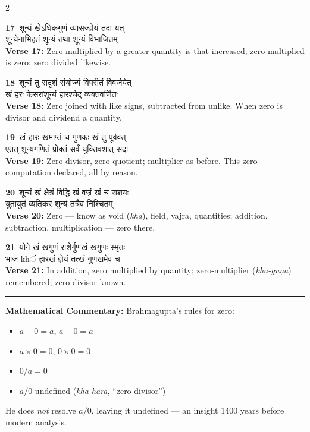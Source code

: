 \documentclass[11pt,a4paper]{article}
\newcommand{\dev}[1]{{\devanagarifont #1}}
\newcommand{\iast}[1]{\textit{#1}}
\newcommand{\vnum}[1]{\textcolor{versenumbercolor}{\textbf{#1}}}
\begin{document}
\begin{paracol}{2}

\switchcolumn[0]
\vnum{17}\ \dev{शून्यं खेऽधिकगुणं व्यासज्ज्ञेयं तदा यत्}\\
\dev{शून्येनाभिहतं शून्यं तथा शून्यं विभाजितम्}\\
\switchcolumn[1]
\textbf{Verse 17:} Zero multiplied by a greater quantity is that increased; zero multiplied is zero; zero divided likewise.

\switchcolumn[0]
\vnum{18}\ \dev{शून्यं तु सदृशं संयोज्यं विपरीतं विवर्जयेत्}\\
\dev{खं हरः केसरांशून्यं हारश्चेद् व्यक्तवर्जितः}\\
\switchcolumn[1]
\textbf{Verse 18:} Zero joined with like signs, subtracted from unlike. When zero is divisor and dividend a quantity.

\switchcolumn[0]
\vnum{19}\ \dev{खं हारः खमाप्तं च गुणकः खं तु पूर्ववत्}\\
\dev{एतत् शून्यगणितं प्रोक्तं सर्वं युक्तिवशात् सदा}\\
\switchcolumn[1]
\textbf{Verse 19:} Zero-divisor, zero quotient; multiplier as before. This zero-computation declared, all by reason.

\switchcolumn[0]
\vnum{20}\ \dev{शून्यं खं क्षेत्रं विद्धि खं वज्रं खं च राशयः}\\
\dev{युतायुतं व्यतिकरं शून्यं तत्रैव निश्चितम्}\\
\switchcolumn[1]
\textbf{Verse 20:} Zero --- know as void (\iast{kha}), field, vajra, quantities; addition, subtraction, multiplication --- zero there.

\switchcolumn[0]
\vnum{21}\ \dev{योगे खं खगुणं राशेर्गुणखं खगुणः स्मृतः}\\
\dev{भाज khं हारखं ज्ञेयं तत्खं गुणखमेव च}\\
\switchcolumn[1]
\textbf{Verse 21:} In addition, zero multiplied by quantity; zero-multiplier (\iast{kha-gu\d na}) remembered; zero-divisor known.

\end{paracol}

\vspace{0.3em}
\noindent\rule{\textwidth}{0.4pt}
\vspace{0.2em}
\noindent\textbf{Mathematical Commentary:} Brahmagupta's rules for zero:
\begin{itemize}[nosep]
\item $a + 0 = a$, $a - 0 = a$
\item $a \times 0 = 0$, $0 \times 0 = 0$
\item $0 / a = 0$
\item $a / 0$ undefined (\iast{kha-h\=ara}, ``zero-divisor'')
\end{itemize}
He does \textit{not} resolve $a/0$, leaving it undefined --- an insight 1400 years before modern analysis.
\vspace{0.3em}
\end{document}

